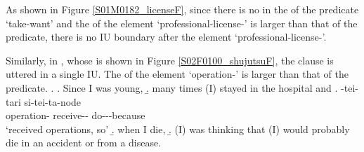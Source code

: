 As shown in Figure \ref{S01M0182_licenseF},
since there is no  in the  of the predicate  `take-want' and the  of the element  `professional-license-' is larger than that of the predicate,
there is no IU boundary after the element  `professional-license-'.

Similarly, in \Next[c],
whose  is shown in Figure \ref{S02F0100_shujutsuF},
the clause is uttered in a single IU.
The  of the element  `operation-'
is larger than that of the predicate.
%
\ex.\label{S02F0100_shujutsu}
 \a. Since I was young,
 \b. many times (I) stayed in the hospital and
 \bg.  -tei-tari \tp{\dvline} si-tei-ta-node \tp{\dvline} \\
 		operation- receive-- {} do---because {} \\
		`received operations, so'
 \b. when I die,
 \b. (I) was thinking that (I) would probably die in an accident or from a disease.

